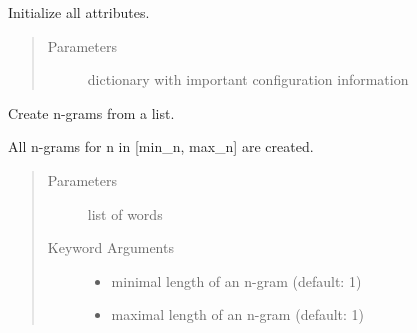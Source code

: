 \documentclass[letterpaper,10pt,english]{sphinxmanual}
\begin{document}
\begin{fulllineitems}
\begin{fulllineitems}
\end{fulllineitems}


\begin{fulllineitems}
\label{\detokenize{api:geoschutz_check.Geoschutz.__init__}}
Initialize all attributes.
\begin{quote}\begin{description}
\item[{Parameters}] \leavevmode
{} \textendash{} dictionary with important configuration information

\end{description}\end{quote}

\end{fulllineitems}


\begin{fulllineitems}
\label{\detokenize{api:geoschutz_check.Geoschutz.create_ngrams}}
Create n-grams from a list.

All n-grams for n in {[}min\_n, max\_n{]} are created.
\begin{quote}\begin{description}
\item[{Parameters}] \leavevmode
{} \textendash{} list of words

\item[{Keyword Arguments}] \leavevmode\begin{itemize}
\item {} 
 \textendash{} minimal length of an n-gram (default: 1)

\item {} 
 \textendash{} maximal length of an n-gram (default: 1)

\end{itemize}

\end{description}\end{quote}

\end{fulllineitems}


\end{fulllineitems}
\end{document}
